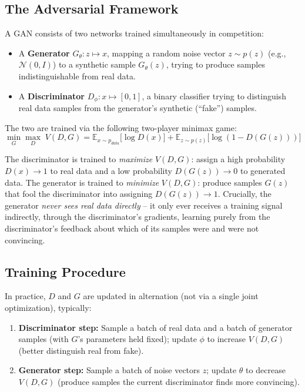 \documentclass[12pt,a4paper]{article}
\begin{document}
\subsection{The Adversarial Framework}

\begin{defbox}
A GAN consists of two networks trained simultaneously in competition:
\begin{itemize}[leftmargin=1.5em]
    \item A \textbf{Generator} $G_\theta: z \mapsto x$, mapping a random noise vector $z \sim p(z)$ (e.g., $\mathcal{N}(0,I)$) to a synthetic sample $G_\theta(z)$, trying to produce samples indistinguishable from real data.
    \item A \textbf{Discriminator} $D_\phi: x \mapsto [0,1]$, a binary classifier trying to distinguish real data samples from the generator's synthetic (``fake'') samples.
\end{itemize}
The two are trained via the following two-player minimax game:
\[
\min_{G} \max_{D} \; V(D,G) = \mathbb{E}_{x \sim p_{data}}\big[\log D(x)\big] + \mathbb{E}_{z\sim p(z)}\big[\log(1 - D(G(z)))\big]
\]
\end{defbox}

\begin{keyidea}
The discriminator is trained to \emph{maximize} $V(D,G)$: assign a high probability $D(x)\to 1$ to real data and a low probability $D(G(z)) \to 0$ to generated data. The generator is trained to \emph{minimize} $V(D,G)$: produce samples $G(z)$ that fool the discriminator into assigning $D(G(z)) \to 1$. Crucially, the generator \emph{never sees real data directly} -- it only ever receives a training signal indirectly, through the discriminator's gradients, learning purely from the discriminator's feedback about which of its samples were and were not convincing.
\end{keyidea}

\subsection{Training Procedure}

In practice, $D$ and $G$ are updated in alternation (not via a single joint optimization), typically:
\begin{enumerate}[leftmargin=1.5em]
    \item \textbf{Discriminator step:} Sample a batch of real data and a batch of generator samples (with $G$'s parameters held fixed); update $\phi$ to increase $V(D,G)$ (better distinguish real from fake).
    \item \textbf{Generator step:} Sample a batch of noise vectors $z$; update $\theta$ to decrease $V(D,G)$ (produce samples the current discriminator finds more convincing).
\end{enumerate}
\end{document}
